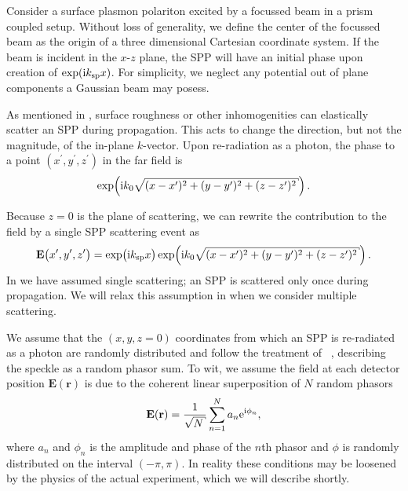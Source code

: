 Consider a surface plasmon polariton excited by a focussed beam in a prism
coupled setup.  Without loss of generality, we define the center of the
focussed beam as the origin of a three dimensional Cartesian coordinate
system.  If the beam is incident in the $x$-$z$ plane, the SPP will have an
initial phase upon creation of $\exp({\mathrm{i}} k_\mathrm{sp} x)$.  For simplicity, we
neglect any potential out of plane components a Gaussian beam may posess. 

As mentioned in , surface roughness or other
inhomogenities can elastically scatter an SPP during propagation.  This
acts to change the direction, but not the magnitude, of the in-plane
$k$-vector.  Upon re-radiation as a photon, the phase to a point
$(x^\prime,y^\prime,z^\prime)$ in the far field is 
\begin{equation}
\exp\!\left(\mi k_0 \sqrt{ (x-x^\prime)^2 + (y-y^\prime)^2 + (z-z^\prime)^2}\right).
\end{equation}

Because $z=0$ is the plane of scattering, we can rewrite the contribution
to the field by a single SPP scattering event as
\begin{equation}
\mathbf{E}\big(x^\prime,y^\prime,z^\prime\big)=\exp\!\big( \mi \ksp x \big)
\exp\!\left(\mi k_0 \sqrt{ (x-x^\prime)^2 + (y-y^\prime)^2 + (z-z^\prime)^2}\right).
\label{eqn:sppsinglescattering}
\end{equation}
In  we have assumed single scattering; an
SPP is scattered only once during propagation.  We will relax this
assumption in  when we consider multiple
scattering.

We assume that the $(x,y,z=0)$ coordinates from which an SPP is re-radiated
as a photon are randomly distributed and follow the treatment of
~\cite{goodman2007speckle}, describing the speckle as a
random phasor sum.  To wit, we assume the field at each detector position
$\mathbf{E}(\mathbf{r})$ is due to the coherent linear superposition of $N$
random phasors
\begin{equation}
\mathbf{E}(\mathbf{r}) = \frac{1}{\sqrt{N}} \sum_{n=1}^{N} a_n \me^{\mi \phi_n},
\label{eqn:phasorsum}
\end{equation}
where $a_n$ and $\phi_n$ is the amplitude and phase of the $n$th phasor 
and $\phi$ is randomly distributed on the interval $(-\pi,\pi)$.
In reality these conditions may be loosened by the physics of the actual
experiment, which we will describe shortly.

